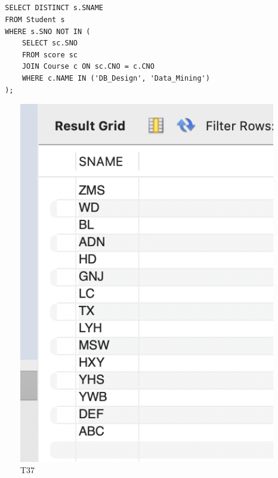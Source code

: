 \documentclass[UTF8]{ctexart}
\begin{document}
\subsection{}
\begin{lstlisting}
  SELECT DISTINCT s.SNAME
  FROM Student s
  WHERE s.SNO NOT IN (
      SELECT sc.SNO
      FROM score sc
      JOIN Course c ON sc.CNO = c.CNO
      WHERE c.NAME IN ('DB_Design', 'Data_Mining')
  );  
\end{lstlisting}
\begin{figure}[H]
  \centering
  \includegraphics[scale=0.7]{pics/37.png}
  \caption*{T37}
\end{figure}
\end{document}
